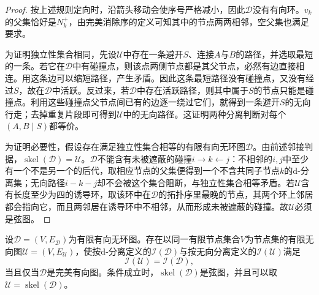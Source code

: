 \begin{proof}
按上述规则定向时，沿箭头移动会使序号严格减小，因此$\mathcal{D}$没有有向环。$v_k$的父集恰好是$N_k^+$，由完美消除序的定义可知其中的节点两两相邻，空父集也满足要求。

为证明独立性集合相同，先设$\mathcal{U}$中存在一条避开$S$、连接$A$与$B$的路径，并选取最短的一条。若它在$\mathcal{D}$中有碰撞点，则该点两侧节点都是其父节点，必然有边直接相连。用这条边可以缩短路径，产生矛盾。因此这条最短路径没有碰撞点，又没有经过$S$，故在$\mathcal{D}$中活跃。反过来，若$\mathcal{D}$中存在活跃路径，则其中属于$S$的节点只能是碰撞点。利用这些碰撞点父节点间已有的边逐一绕过它们，就得到一条避开$S$的无向行走；去掉重复片段即可得到$\mathcal{U}$中的无向路径。这证明两种分离判断对每个$(A,B\mid S)$都等价。

为证明必要性，假设存在满足独立性集合相等的有限有向无环图$\mathcal{D}$。由前述邻接判据，$\operatorname{skel}(\mathcal{D})=\mathcal{U}$。$\mathcal{D}$不能含有未被遮蔽的碰撞$i\to k\leftarrow j$：不相邻的$i,j$中至少有一个不是另一个的后代，取相应节点的父集便得到一个不含共同子节点$k$的d-分离集；无向路径$i-k-j$却不会被这个集合阻断，与独立性集合相等矛盾。若$\mathcal{U}$含有长度至少为四的诱导环，取该环中在$\mathcal{D}$的拓扑序里最晚的节点，其两个环上邻居都会指向它，而且两邻居在诱导环中不相邻，从而形成未被遮蔽的碰撞。故$\mathcal{U}$必须是弦图。
\end{proof}

\begin{theorem}[有向图的完美无向图表示]
  \label{thm:pgm-representations-perfect-undirected}
  设$\mathcal{D}=(V,E_{\mathcal D})$为有限有向无环图。存在以同一有限节点集合$V$为节点集的有限无向图$\mathcal{U}=(V,E_{\mathcal U})$，使按d-分离定义的$\mathcal{I}(\mathcal{D})$与按无向分离定义的$\mathcal{I}(\mathcal{U})$满足
  \[
    \mathcal{I}(\mathcal{U})=\mathcal{I}(\mathcal{D}),
  \]
  当且仅当$\mathcal{D}$是完美有向图。条件成立时，$\operatorname{skel}(\mathcal{D})$是弦图，并且可以取$\mathcal{U}=\operatorname{skel}(\mathcal{D})$。
\end{theorem}

